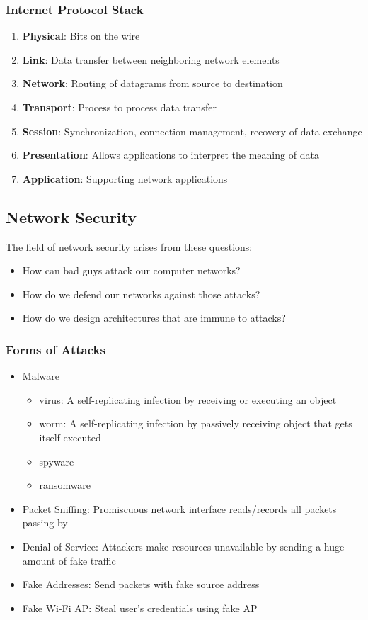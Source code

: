 \subsubsection{Internet Protocol Stack}
\begin{enumerate}
	\item \textbf{Physical}: Bits on the wire
	\item \textbf{Link}: Data transfer between neighboring network elements
	\item \textbf{Network}: Routing of datagrams from source to destination
	\item \textbf{Transport}: Process to process data transfer
	\item \textbf{Session}: Synchronization, connection management, recovery of data exchange
	\item \textbf{Presentation}: Allows applications to interpret the meaning of data
	\item \textbf{Application}: Supporting network applications
\end{enumerate}

\subsection{Network Security}
The field of network security arises from these questions:
\begin{itemize}
	\item How can bad guys attack our computer networks?
	\item How do we defend our networks against those attacks?
	\item How do we design architectures that are immune to attacks?
\end{itemize}

\subsubsection{Forms of Attacks}
\begin{itemize}
	\item Malware
	\begin{itemize}
		\item virus: A self-replicating infection by receiving or executing an object
		\item worm: A self-replicating infection by passively receiving object that gets itself executed
		\item spyware
		\item ransomware
	\end{itemize}
	\item Packet Sniffing: Promiscuous network interface reads/records all packets passing by
	\item Denial of Service: Attackers make resources unavailable by sending a huge amount of fake traffic
	\item Fake Addresses: Send packets with fake source address
	\item Fake Wi-Fi AP: Steal user's credentials using fake AP
\end{itemize}

